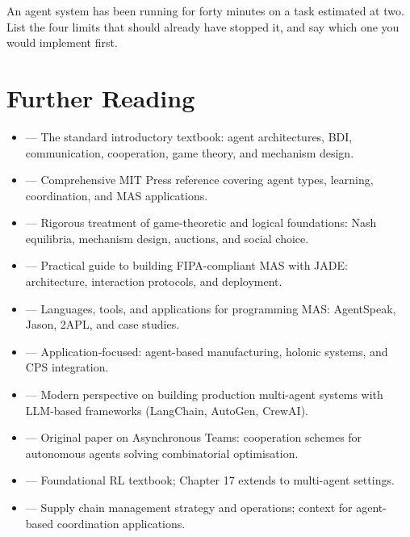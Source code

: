 \begin{checkpoint}
An agent system has been running for forty minutes on a task estimated at two.
List the four limits that should already have stopped it, and say which one you
would implement first.
\end{checkpoint}


\section{Further Reading}

\begin{itemize}
    \item {} --- The standard introductory textbook: agent architectures, BDI, communication, cooperation, game theory, and mechanism design.
    \item {} --- Comprehensive MIT Press reference covering agent types, learning, coordination, and MAS applications.
    \item {} --- Rigorous treatment of game-theoretic and logical foundations: Nash equilibria, mechanism design, auctions, and social choice.
    \item {} --- Practical guide to building FIPA-compliant MAS with JADE: architecture, interaction protocols, and deployment.
    \item {} --- Languages, tools, and applications for programming MAS: AgentSpeak, Jason, 2APL, and case studies.
    \item {} --- Application-focused: agent-based manufacturing, holonic systems, and CPS integration.
    \item {} --- Modern perspective on building production multi-agent systems with LLM-based frameworks (LangChain, AutoGen, CrewAI).
    \item {} --- Original paper on Asynchronous Teams: cooperation schemes for autonomous agents solving combinatorial optimisation.
    \item {} --- Foundational RL textbook; Chapter 17 extends to multi-agent settings.
    \item {} --- Supply chain management strategy and operations; context for agent-based coordination applications.
\end{itemize}
